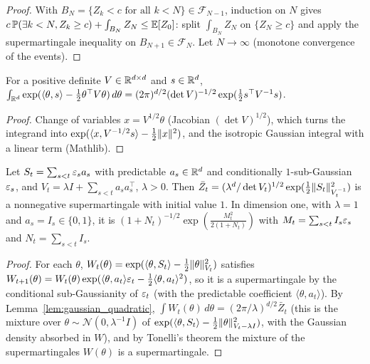 \begin{proof}
  \leanok
  With $B_N = \{Z_k < c \text{ for all } k < N\} \in \mathcal F_{N-1}$, induction on $N$ gives
  $c\, \mathbb{P}(\exists k < N, Z_k \ge c) + \int_{B_N} Z_N \le \mathbb{E}[Z_0]$: split $\int_{B_N} Z_N$ on
  $\{Z_N \ge c\}$ and apply the supermartingale inequality on $B_{N+1} \in \mathcal F_N$. Let
  $N \to \infty$ (monotone convergence of the events).
\end{proof}

\begin{lemma}
  \label{lem:gaussian_quadratic}
  \leanok
  For a positive definite $V \in \mathbb{R}^{d \times d}$ and $s \in \mathbb{R}^d$,
  $\int_{\mathbb{R}^d} \exp(\langle \theta, s\rangle - \frac12 \theta^\top V \theta)\, d\theta =
  (2\pi)^{d/2} (\det V)^{-1/2} \exp(\frac12 s^\top V^{-1} s)$.
\end{lemma}

\begin{proof}
  \leanok
  Change of variables $x = V^{1/2} \theta$ (Jacobian $(\det V)^{1/2}$), which turns the integrand
  into $\exp(\langle x, V^{-1/2} s\rangle - \frac12 \lVert x \rVert^2)$, and the isotropic Gaussian integral
  with a linear term (Mathlib).
\end{proof}

\begin{lemma}
  \label{lem:mixture_supermartingale}
  \leanok
  Let $S_t = \sum_{s < t} \varepsilon_s a_s$ with predictable $a_s \in \mathbb{R}^d$ and conditionally
  $1$-sub-Gaussian $\varepsilon_s$, and $V_t = \lambda I + \sum_{s < t} a_s a_s^\top$, $\lambda > 0$. Then
  $\bar Z_t = (\lambda^d/\det V_t)^{1/2} \exp(\frac12 \lVert S_t \rVert^2_{V_t^{-1}})$ is a nonnegative
  supermartingale with initial value $1$. In dimension one, with $\lambda = 1$ and
  $a_s = I_s \in \{0, 1\}$, it is $(1 + N_t)^{-1/2} \exp(\frac{M_t^2}{2(1 + N_t)})$ with
  $M_t = \sum_{s < t} I_s \varepsilon_s$ and $N_t = \sum_{s < t} I_s$.
\end{lemma}

\begin{proof}
  \leanok
  For each $\theta$, $W_t(\theta) = \exp(\langle \theta, S_t\rangle - \frac12 \lVert \theta \rVert^2_{V_t})$
  satisfies $W_{t+1}(\theta) = W_t(\theta) \exp(\langle \theta, a_t\rangle \varepsilon_t - \frac12
  \langle \theta, a_t\rangle^2)$, so it is a supermartingale by the conditional sub-Gaussianity of
  $\varepsilon_t$ (with the predictable coefficient $\langle \theta, a_t\rangle$). By
  Lemma~\ref{lem:gaussian_quadratic}, $\int W_t(\theta)\, d\theta = (2\pi/\lambda)^{d/2} \bar Z_t$
  (this is the mixture over $\theta \sim \mathcal N(0, \lambda^{-1} I)$ of
  $\exp(\langle \theta, S_t\rangle - \frac12 \lVert \theta \rVert^2_{V_t - \lambda I})$, with the Gaussian
  density absorbed in $W$), and by Tonelli's theorem the mixture of the supermartingales
  $W(\theta)$ is a supermartingale.
\end{proof}

